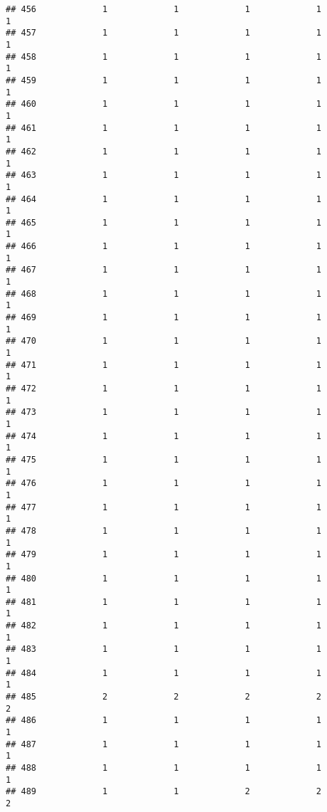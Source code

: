 \documentclass[
]{article}
\begin{document}
\begin{verbatim}
## 456             1             1             1             1             1
## 457             1             1             1             1             1
## 458             1             1             1             1             1
## 459             1             1             1             1             1
## 460             1             1             1             1             1
## 461             1             1             1             1             1
## 462             1             1             1             1             1
## 463             1             1             1             1             1
## 464             1             1             1             1             1
## 465             1             1             1             1             1
## 466             1             1             1             1             1
## 467             1             1             1             1             1
## 468             1             1             1             1             1
## 469             1             1             1             1             1
## 470             1             1             1             1             1
## 471             1             1             1             1             1
## 472             1             1             1             1             1
## 473             1             1             1             1             1
## 474             1             1             1             1             1
## 475             1             1             1             1             1
## 476             1             1             1             1             1
## 477             1             1             1             1             1
## 478             1             1             1             1             1
## 479             1             1             1             1             1
## 480             1             1             1             1             1
## 481             1             1             1             1             1
## 482             1             1             1             1             1
## 483             1             1             1             1             1
## 484             1             1             1             1             1
## 485             2             2             2             2             2
## 486             1             1             1             1             1
## 487             1             1             1             1             1
## 488             1             1             1             1             1
## 489             1             1             2             2             2

\end{verbatim}
\end{document}
